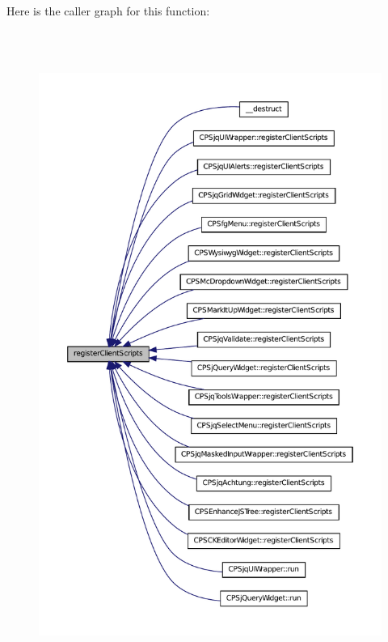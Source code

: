 Here is the caller graph for this function:\nopagebreak
\begin{figure}[H]
\begin{center}
\leavevmode
\includegraphics[height=600pt]{classCPSWidget_a59080ee7d7949e19f5af41e26ff53806_icgraph}
\end{center}
\end{figure}


